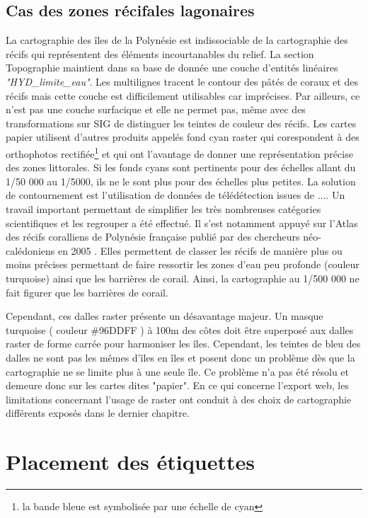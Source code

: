 \subsection{Cas des zones récifales lagonaires}

La cartographie des îles de la Polynésie est indissociable de la cartographie des récifs qui représentent des éléments incourtanables du relief. La section Topographie maintient dans sa base de donnée une couche d'entités linéaires
\textit{"HYD\_limite\_eau"}. Les multilignes tracent le contour des pâtés de coraux et des récifs mais cette couche est difficilement utilisables car imprécises. Par ailleurs, ce n'est pas une couche surfacique et elle ne permet pas, même avec des transformations sur SIG de distinguer les teintes de couleur des récifs.
Les cartes papier utilisent d'autres produits appelés fond cyan raster qui corespondent à des orthophotos rectifiée\footnote{la bande bleue est symbolisée par une échelle de cyan} et qui ont l'avantage de donner une représentation précise des zones littorales. Si les fonds cyans sont pertinents pour des échelles allant du 1/50 000 au 1/5000, ils ne le sont plus pour des échelles plus petites. La solution de contournement est l'utilisation de données de télédétection issues de ....
Un travail important permettant de simplifier les très nombreuses catégories scientifiques et les regrouper a été effectué. Il s'est notamment appuyé sur  l'Atlas des récifs coralliens de Polynésie française publié par des chercheurs néo-calédoniens en 2005 \cite{Noumea_2005}.
Elles permettent de classer les récifs de manière plus ou moins précises permettant de faire ressortir les zones d'eau peu profonde (couleur turquoise) ainsi que les barrières de corail. Ainsi, la cartographie au 1/500 000 ne fait figurer que les barrières de corail.

Cependant, ces dalles raster présente un désavantage majeur. Un masque turquoise ( couleur \#96DDFF ) à 100m des côtes doit être superposé aux dalles raster de forme carrée pour harmoniser les îles. Cependant, les teintes de bleu des dalles ne sont pas les mêmes d'îles en îles et posent donc un problème dès que la cartographie ne se limite plus à une seule île. Ce problème n'a pas été résolu et demeure donc sur les cartes dites "papier". En ce qui concerne l'export web, les limitations concernant l'usage de raster ont conduit à des choix de cartographie différents exposés dans le dernier chapitre.



\section {Placement des étiquettes}

